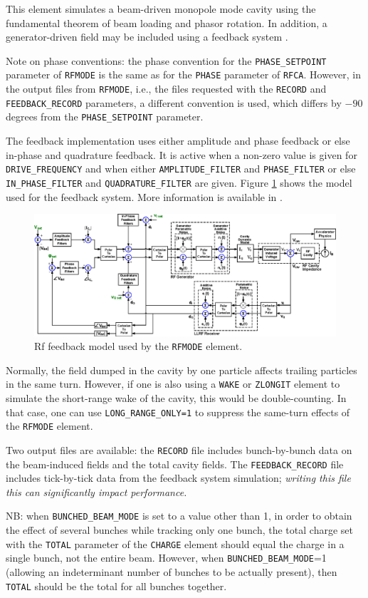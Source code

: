 This element simulates a beam-driven monopole mode cavity using the fundamental theorem of beam loading and phasor rotation.
In addition, a generator-driven field may be included using a feedback system \cite{Berenc-IPAC15-MOPMA006}.

Note on phase conventions: the phase convention for the \verb|PHASE_SETPOINT|  parameter of \verb|RFMODE| is the
same as for the \verb|PHASE| parameter of \verb|RFCA|. However, in the output files from \verb|RFMODE|, i.e., the
files requested with the \verb|RECORD| and \verb|FEEDBACK_RECORD| parameters, a different convention is used, which 
differs by $-90$ degrees from the \verb|PHASE_SETPOINT|  parameter. 

The feedback implementation uses either amplitude and phase feedback or else in-phase and quadrature feedback.
It is active when a non-zero value is given for \verb|DRIVE_FREQUENCY| and when either
\verb|AMPLITUDE_FILTER| and \verb|PHASE_FILTER| or else
\verb|IN_PHASE_FILTER| and \verb|QUADRATURE_FILTER| are given.
Figure \ref{fig:rfFeedbackModel} shows the model used for the feedback system.
More information is available in \cite{Berenc-IPAC15-MOPMA006}.

\begin{figure}[htb]
\center
\includegraphics{rfFeedbackModel}
\caption{Rf feedback model used by the {\tt RFMODE} element.}
\label{fig:rfFeedbackModel}
\end{figure}

Normally, the field dumped in the cavity by one particle affects trailing particles in the same turn.
However, if one is also using a \verb|WAKE| or \verb|ZLONGIT| element to simulate the short-range wake of the cavity, this would be double-counting.
In that case, one can use \verb|LONG_RANGE_ONLY=1| to suppress the same-turn effects of the \verb|RFMODE| element.

Two output files are available: the \verb|RECORD| file includes bunch-by-bunch data on the beam-induced fields and the total cavity fields.
The \verb|FEEDBACK_RECORD| file includes tick-by-tick data from the feedback system simulation; {\em writing this file this can significantly impact performance.}

NB: when \verb|BUNCHED_BEAM_MODE| is set to a value other than 1, in order to obtain the effect of several bunches while tracking
only one bunch, the total charge set with the \verb|TOTAL| parameter of the \verb|CHARGE| element should equal the charge in
a single bunch, not the entire beam. However, when \verb|BUNCHED_BEAM_MODE|=1 (allowing an indeterminant number of bunches to be
actually present), then \verb|TOTAL| should be the total for all bunches together.

